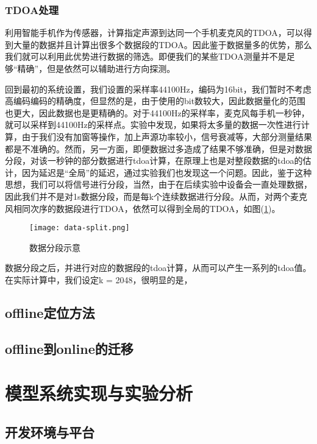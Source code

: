 \documentclass[winfonts]{njuthesis}
\begin{document}
		\subsection{TDOA处理}
		
		利用智能手机作为传感器，计算指定声源到达同一个手机麦克风的TDOA，可以得到大量的数据并且计算出很多个数据段的TDOA。因此鉴于数据量多的优势，那么我们就可以利用此优势进行数据的筛选。即便我们的某些TDOA测量并不是足够“精确”，但是依然可以辅助进行方向探测。
		
		回到最初的系统设置，我们设置的采样率44100Hz，编码为16bit，我们暂时不考虑高编码编码的精确度，但显然的是，由于使用的bit数较大，因此数据量化的范围也更大，因此数据也是更精确的。对于44100Hz的采样率，麦克风每手机一秒钟，就可以采样到44100Hz的采样点。实验中发现，如果将太多量的数据一次性进行计算，由于我们没有加窗等操作，加上声源功率较小，信号衰减等，大部分测量结果都是不准确的。然而，另一方面，即便数据过多造成了结果不够准确，但是对数据分段，对该一秒钟的部分数据进行tdoa计算，在原理上也是对整段数据的tdoa的估计，因为延迟是“全局”的延迟，通过实验我们也发现这一个问题。因此，鉴于这种思想，我们可以将信号进行分段，当然，由于在后续实验中设备会一直处理数据，因此我们并不是对1s数据分段，而是每k个连续数据进行分段。从而，对两个麦克风相同次序的数据段进行TDOA，依然可以得到全局的TDOA，如图(\ref{fig: data-split})。
		
		\begin{figure}[H]
			\centering
			\texttt{[image: data-split.png]} 
			\caption{{数据分段示意}}
			\label{fig: data-split}
		\end{figure}
		
		数据分段之后，并进行对应的数据段的tdoa计算，从而可以产生一系列的tdoa值。在实际计算中，我们设定k = 2048，很明显的是，
		
		
	\section{offline定位方法}
	
	\section{offline到online的迁移}
	
\chapter{模型系统实现与实验分析}
	\section{开发环境与平台}
\end{document}
